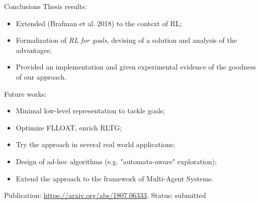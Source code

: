 \documentclass{beamer}
\begin{document}
\begin{frame}{Conclusions}
	Thesis results:
	\begin{itemize}
		\item Extended (Brafman et al. 2018) to the context of RL;
		\item Formalization of \emph{RL for \LLf goals}, devising of a solution and analysis of the advantages;
		\item Provided an implementation and given experimental evidence of the goodness of our approach.
	\end{itemize}
	Future works:
	\begin{itemize}
		\item Minimal low-level representation to tackle \LLf goals;
		\item Optimize FLLOAT, enrich RLTG;
		\item Try the approach in several real world applications;
		\item Design of ad-hoc algorithms (e.g. "automata-aware" exploration);
		\item Extend the approach to the framework of Multi-Agent Systems.
	\end{itemize}
	Publication: \href{https://arxiv.org/abs/1807.06333}{https://arxiv.org/abs/1807.06333}. Status: submitted
	
\end{frame}
\end{document}

